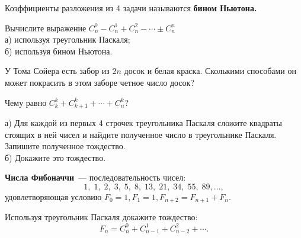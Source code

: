 Коэффициенты разложения из 4 задачи называются \textbf{бином Ньютона.}
\begin{problems}
\item Вычислите выражение $C_n^0-C_n^1+C_n^2-\cdots\pm C_n^n$\\
а) используя треугольник Паскаля;\\
б) используя бином Ньютона.

\item У Тома Сойера есть забор из $2n$ досок и белая краска. Сколькими способами он может покрасить в этом заборе четное число досок?

\item Чему равно $C_k^k+C_{k+1}^k+\cdots+C_n^k$?

\item а) Для каждой из первых 4 строчек треугольника Паскаля сложите квадраты стоящих в ней чисел и найдите полученное число в треугольнике Паскаля. Запишите полученное тождество.\\
б) Докажите это тождество.
\end{problems}

\textbf{Числа Фибоначчи}~--- последовательность чисел:
$$1, \;1, \;2, \;3, \;5, \;8, \;13, \;21, \;34, \;55, \;89,\dots,$$
удовлетворяющая условию $F_0=1, F_1=1, F_{n+2}=F_{n+1}+F_n.$

\begin{problems}
\item Используя треугольник Паскаля докажите тождество: $$F_n=C_n^0+C_{n-1}^1+C_{n-2}^2+\cdots.$$
\end{problems}
